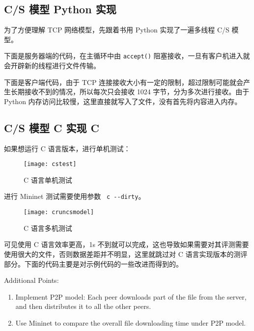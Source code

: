 
\subsection{C/S 模型 Python 实现 \faPython}

为了方便理解 TCP 网络模型，先跟着书用 Python 实现了一遍多线程 C/S 模型。

下面是服务器端的代码，在主循环中由 \verb"accept()" 阻塞接收，一旦有客户机进入就会开辟新的线程进行文件传输。


下面是客户端代码，由于 TCP 连接接收大小有一定的限制，超过限制可能就会产生长期接收不到的情况，所以每次只会接收 1024 字节，分为多次进行接收。由于 Python 内存访问比较慢，这里直接就写入了文件，没有首先将内容进入内存。


\subsection{C/S 模型 C 实现 \textsf{C}}

如果想运行 C 语言版本，进行单机测试：
\begin{figure}[H]
    \centering
    \texttt{[image: cstest]}
    \caption{C 语言单机测试}
\end{figure}

进行 Mininet 测试需要使用参数 \verb" c --dirty"。

\begin{figure}[H]
    \centering
    \texttt{[image: cruncsmodel]}
    \caption{C 语言多机测试}
\end{figure}

可见使用 C 语言效率更高，1s 不到就可以完成，这也导致如果需要对其评测需要使用很大的文件，否则数据差距并不明显，这里就跳过对 C 语言实现版本的测评部分。下面的代码主要是对示例代码的一些改进而得到的。



Additional Points:

\begin{enumerate}
    \item Implement P2P model: Each peer downloads part of the file from the server, and then distributes it to all the other peers.

    \item Use Mininet to compare the overall file downloading time under P2P model.
\end{enumerate}

